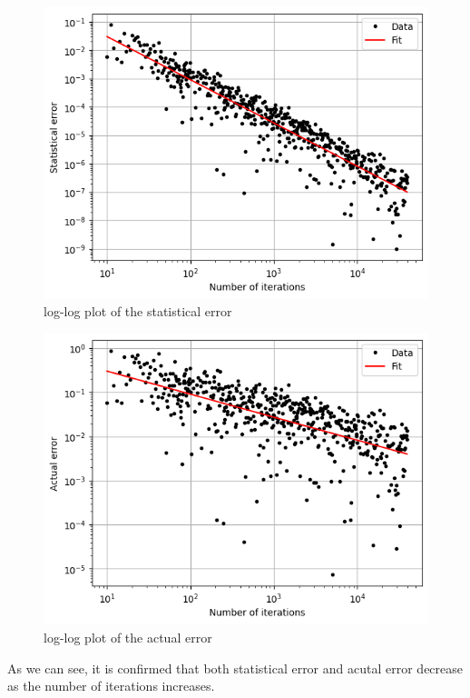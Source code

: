 \documentclass{article}
\begin{document}
\begin{figure}[H]
    \centering
    \includegraphics[width=.7\linewidth]{images/Figure1.2.png}
    \caption{log-log plot of the statistical error}
    \label{fig:1.1}
\end{figure}
\begin{figure}[H]
    \centering
    \includegraphics[width=.7\linewidth]{images/Figure1.1.png}
    \caption{log-log plot of the actual error}
    \label{fig:121}
\end{figure}
As we can see, it is confirmed that both statistical error and acutal error decrease as the number of iterations increases.
\clearpage
\end{document}
